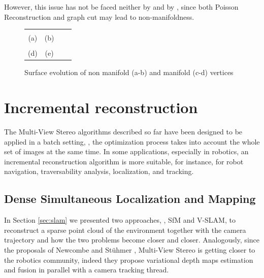 However, this issue has not be faced neither by \cite{fu10} and by \cite{labatut2007efficient,vu_et_al_2012}, since both Poisson Reconstruction and graph cut may lead to non-manifoldness.




\begin{figure}[tb]
\centering
\setlength{\tabcolsep}{1px}
\begin{tabular}{cccc}
{\def\svgwidth{0.47\textwidth}
  }&
{\def\svgwidth{0.47\textwidth}
  }\\
  (a)&(b)\\
{\def\svgwidth{0.47\textwidth}
  }&
{\def\svgwidth{0.47\textwidth}
  }\\
(d)&(e)\\
\end{tabular}
\caption{Surface evolution of non manifold (a-b) and manifold (c-d) vertices}
\label{fig:whymanifold} 
\end{figure}

\section{Incremental reconstruction} 
\label{sec:incr}
The Multi-View Stereo algorithms described so far have been designed to be applied in a batch setting, \ie, the optimization process takes into account the whole set of images at the same time.
In some applications, especially in robotics, an incremental reconstruction algorithm is more suitable, for instance, for robot navigation, traversability analysis, localization, and tracking.
\subsection{Dense Simultaneous Localization and Mapping}
In Section \ref{sec:slam} we presented two approaches, \ie, SfM and V-SLAM, to reconstruct a sparse point cloud of the environment together with the camera trajectory and how the two problems become closer and closer.
Analogously, since the proposals of Newcombe \etal \cite{newcombe2010live,newcombe2011kinectfusion,newcombe2011dtam} and St{\"u}hmer \etal \cite{stuhmer2010real}, Multi-View Stereo is getting closer to the robotics community, indeed they propose variational depth maps estimation and fusion in parallel with a camera tracking thread.

